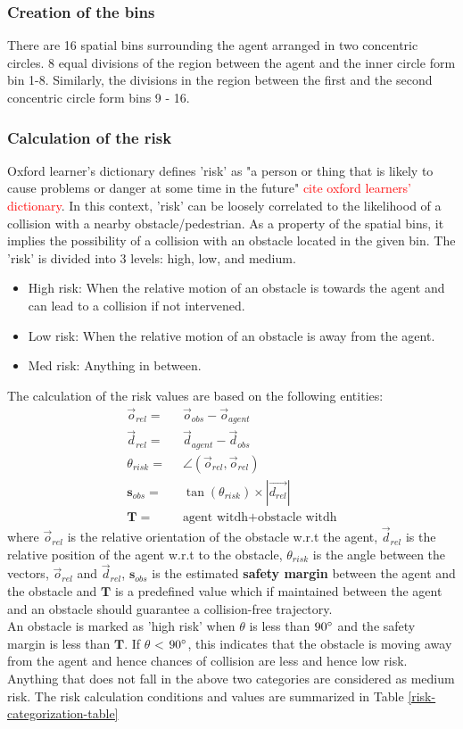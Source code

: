 \subsubsection*{Creation of the bins}
There are 16 spatial bins surrounding the agent arranged in two concentric circles. 8 equal divisions of the region between the agent and the inner circle form bin 1-8. Similarly, the divisions in the region between the first and the second concentric circle form bins 9 - 16.
\subsubsection*{Calculation of the risk}
Oxford learner's dictionary defines 'risk' as "a person or thing that is likely to cause problems or danger at some time in the future" \textcolor{red}{cite oxford learners' dictionary}. In this context, 'risk' can be loosely correlated to the likelihood of a collision with a nearby obstacle/pedestrian. As a property of the spatial bins, it implies the possibility of a collision with an obstacle located in the given bin. 
The 'risk' is divided into 3 levels: high, low, and medium.
\begin{itemize}
    \item High risk:
When the relative motion of an obstacle is towards the agent and can lead to a collision if not intervened.
    \item Low risk:
When the relative motion of an obstacle is away from the agent.
    \item Med risk:
Anything in between.
\end{itemize}
The calculation of the risk values are based on the following entities:
\begin{align}
    \vec{o}_{rel} = & \;\; \vec{o}_{obs} - \vec{o}_{agent}  \\
    \vec{d}_{rel} =  &\;\; \vec{d}_{agent} - \vec{d}_{obs} \\
    \theta_{risk} =  & \;\; \angle (\vec{o}_{rel}, \vec{o}_{rel}) \\
    \mathbf{s}_{obs} = & \;\; \tan(\theta_{risk}) \times |\vec{d_{rel}}| \\
    \mathbf{T} = & \;\; \text{agent witdh} + \text{obstacle witdh}
\end{align}
where $\vec{o}_{rel}$ is the relative orientation of the obstacle w.r.t the agent, $\vec{d}_{rel}$ is the relative position of the agent w.r.t to the obstacle, $\theta_{risk}$ is the angle between the vectors, $\vec{o}_{rel}$ and $\vec{d}_{rel}$,  $\mathbf{s}_{obs}$ is the estimated \textbf{safety margin} between the agent and the obstacle and $\mathbf{T}$ is a predefined value which if maintained between the agent and an obstacle should guarantee a collision-free trajectory.\\
An obstacle is marked as 'high risk' when $\theta$ is less than $90\degree$ and the safety margin is less than $\mathbf{T}$. If $\theta$ < $90 \degree$, this indicates that the obstacle is moving away from the agent and hence chances of collision are less and hence low risk. Anything that does not fall in the above two categories are considered as medium risk. The risk calculation conditions and values are summarized in Table \ref{risk-categorization-table}

